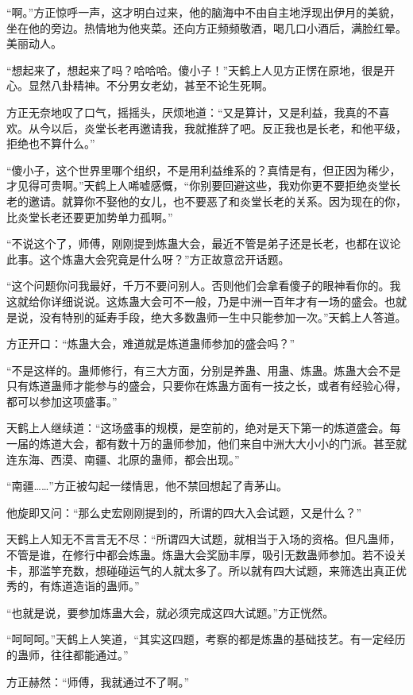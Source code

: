 \begin{this_body}
“啊。”方正惊呼一声，这才明白过来，他的脑海中不由自主地浮现出伊月的美貌，坐在他的旁边。热情地为他夹菜。还向方正频频敬酒，喝几口小酒后，满脸红晕。美丽动人。

“想起来了，想起来了吗？哈哈哈。傻小子！”天鹤上人见方正愣在原地，很是开心。显然八卦精神。不分男女老幼，甚至不论生死啊。

方正无奈地叹了口气，摇摇头，厌烦地道：“又是算计，又是利益，我真的不喜欢。从今以后，炎堂长老再邀请我，我就推辞了吧。反正我也是长老，和他平级，拒绝也不算什么。”

“傻小子，这个世界里哪个组织，不是用利益维系的？真情是有，但正因为稀少，才见得可贵啊。”天鹤上人唏嘘感慨，“你别要回避这些，我劝你更不要拒绝炎堂长老的邀请。就算你不娶他的女儿，也不要恶了和炎堂长老的关系。因为现在的你，比炎堂长老还要更加势单力孤啊。”

“不说这个了，师傅，刚刚提到炼蛊大会，最近不管是弟子还是长老，也都在议论此事。这个炼蛊大会究竟是什么呀？”方正故意岔开话题。

“这个问题你问我最好，千万不要问别人。否则他们会拿看傻子的眼神看你的。我这就给你详细说说。这炼蛊大会可不一般，乃是中洲一百年才有一场的盛会。也就是说，没有特别的延寿手段，绝大多数蛊师一生中只能参加一次。”天鹤上人答道。

方正开口：“炼蛊大会，难道就是炼道蛊师参加的盛会吗？”

“不是这样的。蛊师修行，有三大方面，分别是养蛊、用蛊、炼蛊。炼蛊大会不是只有炼道蛊师才能参与的盛会，只要你在炼蛊方面有一技之长，或者有经验心得，都可以参加这项盛事。”

天鹤上人继续道：“这场盛事的规模，是空前的，绝对是天下第一的炼道盛会。每一届的炼道大会，都有数十万的蛊师参加，他们来自中洲大大小小的门派。甚至就连东海、西漠、南疆、北原的蛊师，都会出现。”

“南疆……”方正被勾起一缕情思，他不禁回想起了青茅山。

他旋即又问：“那么史宏刚刚提到的，所谓的四大入会试题，又是什么？”

天鹤上人知无不言言无不尽：“所谓四大试题，就相当于入场的资格。但凡蛊师，不管是谁，在修行中都会炼蛊。炼蛊大会奖励丰厚，吸引无数蛊师参加。若不设关卡，那滥竽充数，想碰碰运气的人就太多了。所以就有四大试题，来筛选出真正优秀的，有炼道造诣的蛊师。”

“也就是说，要参加炼蛊大会，就必须完成这四大试题。”方正恍然。

“呵呵呵。”天鹤上人笑道，“其实这四题，考察的都是炼蛊的基础技艺。有一定经历的蛊师，往往都能通过。”

方正赫然：“师傅，我就通过不了啊。”


\end{this_body}
